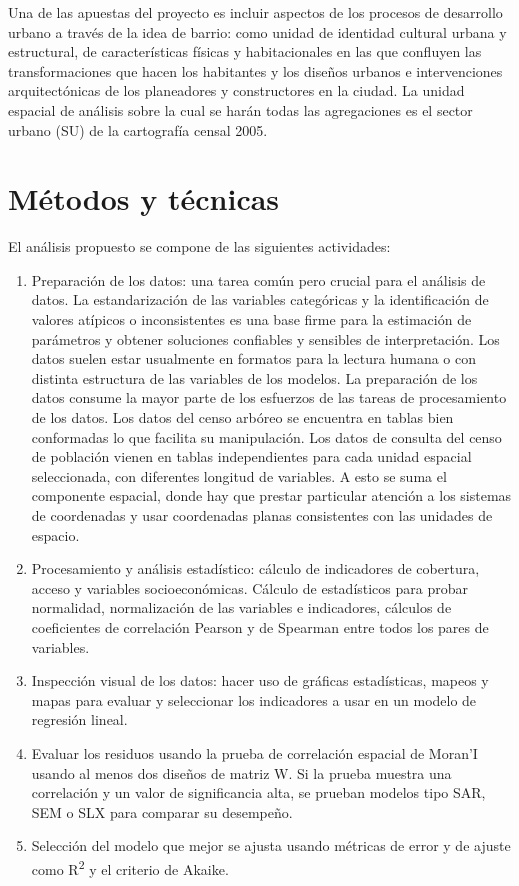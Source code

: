 \documentclass[12pt,]{book}
\providecommand{\tightlist}{%
  \setlength{\itemsep}{0pt}\setlength{\parskip}{0pt}}
\begin{document}
Una de las apuestas del proyecto es incluir aspectos de los procesos de
desarrollo urbano a través de la idea de barrio: como unidad de
identidad cultural urbana y estructural, de características físicas y
habitacionales en las que confluyen las transformaciones que hacen los
habitantes y los diseños urbanos e intervenciones arquitectónicas de los
planeadores y constructores en la ciudad. La unidad espacial de análisis
sobre la cual se harán todas las agregaciones es el sector urbano (SU)
de la cartografía censal 2005.

\section{Métodos y técnicas}\label{metodos-y-tecnicas}

El análisis propuesto se compone de las siguientes actividades:

\begin{enumerate}
\def\labelenumi{\arabic{enumi}.}
\tightlist
\item
  Preparación de los datos: una tarea común pero crucial para el
  análisis de datos. La estandarización de las variables categóricas y
  la identificación de valores atípicos o inconsistentes es una base
  firme para la estimación de parámetros y obtener soluciones confiables
  y sensibles de interpretación. Los datos suelen estar usualmente en
  formatos para la lectura humana o con distinta estructura de las
  variables de los modelos. La preparación de los datos consume la mayor
  parte de los esfuerzos de las tareas de procesamiento de los datos.
  Los datos del censo arbóreo se encuentra en tablas bien conformadas lo
  que facilita su manipulación. Los datos de consulta del censo de
  población vienen en tablas independientes para cada unidad espacial
  seleccionada, con diferentes longitud de variables. A esto se suma el
  componente espacial, donde hay que prestar particular atención a los
  sistemas de coordenadas y usar coordenadas planas consistentes con las
  unidades de espacio.
\item
  Procesamiento y análisis estadístico: cálculo de indicadores de
  cobertura, acceso y variables socioeconómicas. Cálculo de estadísticos
  para probar normalidad, normalización de las variables e indicadores,
  cálculos de coeficientes de correlación Pearson y de Spearman entre
  todos los pares de variables.
\item
  Inspección visual de los datos: hacer uso de gráficas estadísticas,
  mapeos y mapas para evaluar y seleccionar los indicadores a usar en un
  modelo de regresión lineal.
\item
  Evaluar los residuos usando la prueba de correlación espacial de
  Moran'I usando al menos dos diseños de matriz W. Si la prueba muestra
  una correlación y un valor de significancia alta, se prueban modelos
  tipo SAR, SEM o SLX para comparar su desempeño.
\item
  Selección del modelo que mejor se ajusta usando métricas de error y de
  ajuste como R\textsuperscript{2} y el criterio de Akaike.
\end{enumerate}
\end{document}
